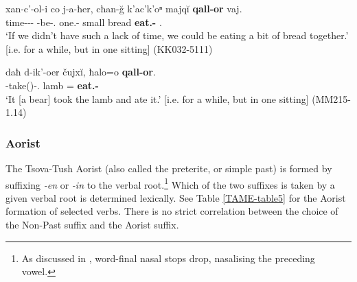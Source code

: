 \begin{exe}
	\ex\label{verbflex-ex47}
	\begin{xlist}
		
		
			\ex\label{verbflex-ex47a}
			\gll xan-c'-ol-i co j-a-ħer, cħan-\u{g} k'ac'k'oⁿ majq\u{i} \textbf{qall-or} vaj. \\
			time-{\Priv}-{\Abstr}-{\Pl} {\Neg} {\J}-be-{\Cond}.{\Pst} one.{\Obl}-{\Trans} small bread \textbf{eat.{\Pfv}-{\Imprf}} {\Fpl}.{\Incl} \\
			\trans `If we didn't have such a lack of time, we could be eating a bit of bread together.' [i.e. for a while, but in one sitting]
			\hfill (KK032-5111)
		
		
		
			\ex\label{verbflex-ex47b}
			\gll daħ d-ik'-oer čujx\u{i}, ħalo=o \textbf{qall-or}. \\
			{\Pv} {\D}-take({\Anim})-{\Imprf}.{\Seq} lamb {\Pv}={\Add} \textbf{eat.{\Pfv}-{\Imprf}} \\
			\trans `It [a bear] took the lamb and ate it.' [i.e. for a while, but in one sitting]
			\hfill (MM215-1.14)
		
		
	\end{xlist}
\end{exe}




\subsubsection{Aorist}

The Tsova-Tush Aorist (also called the preterite, or simple past) is formed by suffixing \textit{-en} or \textit{-in} to the verbal root.\footnote{As discussed in , word-final nasal stops drop, nasalising the preceding vowel.} Which of the two suffixes is taken by a given verbal root is determined lexically. See Table \ref{TAME-table5} for the Aorist formation of selected verbs. There is no strict correlation between the choice of the Non-Past suffix and the Aorist suffix.

